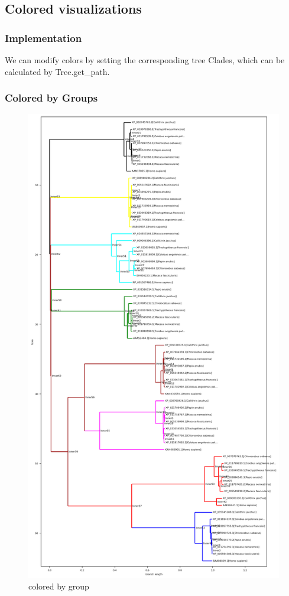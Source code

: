 \documentclass[a4paper, 12pt, one column]{article}
\begin{document}


\subsection{Colored visualizations}
\subsubsection{Implementation}
We can modify colors by setting the corresponding tree Clades, which can be calculated by Tree.get\_path.

\subsubsection{Colored by Groups}
\begin{figure}[H]
    \centering
    \includegraphics[width=.6\linewidth]{colored_group.png}
    \caption{colored by group}
    \label{fig:colored_group}
\end{figure}  
\end{document}
